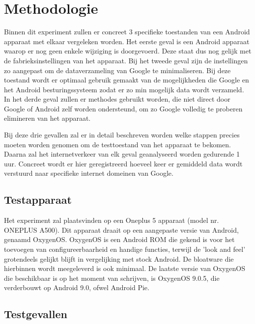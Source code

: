 
\chapter{Methodologie}
\label{ch:methodologie}

Binnen dit experiment zullen er concreet 3 specifieke toestanden van een Android apparaat met elkaar vergeleken worden. Het eerste geval is een Android apparaat waarop er nog geen enkele wijziging is doorgevoerd. Deze staat dus nog gelijk met de fabrieksinstellingen van het apparaat. Bij het tweede geval zijn de instellingen zo aangepast om de dataverzameling van Google te minimaliseren. Bij deze toestand wordt er optimaal gebruik gemaakt van de mogelijkheden die Google en het Android besturingssysteem zodat er zo min mogelijk data wordt verzameld. In het derde geval zullen er methodes gebruikt worden, die niet direct door Google of Android zelf worden ondersteund, om zo Google volledig te proberen elimineren van het apparaat.

Bij deze drie gevallen zal er in detail beschreven worden welke stappen precies moeten worden genomen om de testtoestand van het apparaat te bekomen. Daarna zal het internetverkeer van elk geval geanalyseerd worden gedurende 1 uur. Concreet wordt er hier geregistreerd hoeveel keer er gemiddeld data wordt verstuurd naar specifieke internet domeinen van Google.

\section{Testapparaat}
\label{sec:testapparaat}
Het experiment zal plaatsvinden op een Oneplus 5 apparaat (model nr. ONEPLUS A500). Dit apparaat draait op een aangepaste versie van Android, genaamd OxygenOS. OxygenOS is een Android ROM die gekend is voor het toevoegen van configureerbaarheid en handige functies, terwijl de 'look and feel' grotendeels gelijkt blijft in vergelijking met stock Android. De bloatware die hierbinnen wordt meegeleverd is ook minimaal. De laatste versie van OxygenOS die beschikbaar is op het moment van schrijven, is OxygenOS 9.0.5, die verderbouwt op Android 9.0, ofwel Android Pie.

\section{Testgevallen}
\label{sec:testgevallen}

